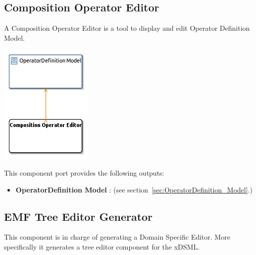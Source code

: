 \documentclass{gemoc} %
\begin{document}
\subsection{Composition Operator Editor}
\label{sec:Composition_Operator_Editor}
A Composition Operator Editor is a tool to display and edit Operator Definition Model.
\begin{center}
\includegraphics*[trim=0.0cm 0.0cm 0cm 0.0cm, clip=true]{../images/generated/Generated_Composition_Operator_Editor.png}
\end{center}


This component port provides the following outputs:
\begin{itemize}
  \item \textbf{OperatorDefinition Model} :
(see section~\ref{sec:OperatorDefinition_Model}.)
\end{itemize}


\subsection{EMF Tree Editor Generator}
\label{sec:EMF_Tree_Editor_Generator}

This component is in charge of generating a Domain Specific Editor. More specifically it generates a tree editor component for the xDSML. 
\end{document}
